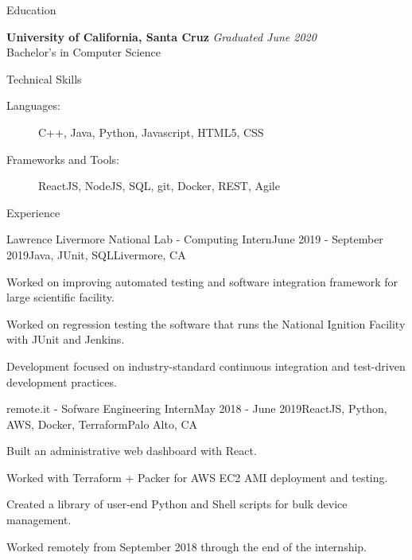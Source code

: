 \documentclass{resume} %
\begin{document}

\begin{rSection}{Education}

    {\bf University of California, Santa Cruz} \hfill {\em Graduated June 2020} \\ 
    Bachelor's in Computer Science

\end{rSection}


\begin{rSection}{Technical Skills}
    \begin{description}
    \item[Languages:] C++, Java, Python, Javascript, HTML5, CSS
    \item[Frameworks and Tools:] ReactJS, NodeJS, SQL, git, Docker, REST, Agile
    \end{description}
\end{rSection}


\begin{rSection}{Experience}
    \begin{rSubsection}{Lawrence Livermore National Lab - Computing Intern}{June 2019 - September 2019}{Java, JUnit, SQL}{Livermore, CA}
        \item Worked on improving automated testing and software integration framework for large scientific facility.
        \item Worked on regression testing the software that runs the National Ignition Facility with JUnit and Jenkins.
        \item Development focused on industry-standard continuous integration and test-driven development practices.
    \end{rSubsection}

    \begin{rSubsection}{remote.it - Sofware Engineering Intern}{May 2018 - June 2019}{ReactJS, Python, AWS, Docker, Terraform}{Palo Alto, CA}
        \item Built an administrative web dashboard with React.
        \item Worked with Terraform + Packer for AWS EC2 AMI deployment and testing.
        \item Created a library of user-end Python and Shell scripts for bulk device management.
        \item Worked remotely from September 2018 through the end of the internship.
    \end{rSubsection}

\end{rSection}
\end{document}
